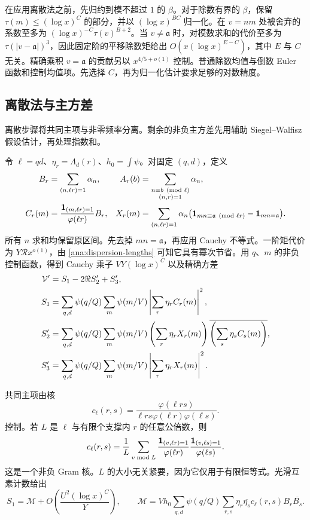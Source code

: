 在应用离散法之前，先归约到模不超过 $1$ 的 $\beta$。对于除数有界的 $\beta$，保留 $\tau(m)\le(\log x)^C$ 的部分，并以 $(\log x)^{BC}$ 归一化。在 $v=nm$ 处被舍弃的系数至多为 $(\log x)^{-C}\tau(v)^{B+2}$。当 $v\ne\mathfrak a$ 时，对模数求和的代价至多为 $\tau(|v-\mathfrak a|)^3$，因此固定阶的平移除数矩给出 $O(x(\log x)^{E-C})$，其中 $E$ 与 $C$ 无关。精确乘积 $v=\mathfrak a$ 的贡献另以 $x^{4/5+o(1)}$ 控制。普通除数均值与倒数 Euler 函数和控制均值项。先选择 $C$，再为归一化估计要求足够的对数精度。

\subsection{离散法与主方差}

离散步骤将共同主项与非零频率分离。剩余的非负主方差先用辅助 Siegel--Walfisz 假设估计，再处理指数和。

令 $\ell=qd$、$\eta_r=\Lambda_d(r)$、$h_0=\int\psi$。对固定 $(q,d)$，定义
\begin{align*}
 B_r&=\sum_{(n,\ell r)=1}\alpha_n,
 &A_r(b)&=\sum_{\substack{n\equiv b\pmod\ell\\(n,r)=1}}\alpha_n,\\
 C_r(m)&=\frac{\mathbf 1_{(m,\ell r)=1}}{\varphi(\ell r)}B_r,
 &X_r(m)&=\sum_{(n,\ell r)=1}\alpha_n
       \bigl(\mathbf 1_{mn\equiv \mathfrak{a}\pmod{\ell r}}-\mathbf 1_{mn=\mathfrak{a}}\bigr).
\end{align*}
所有 $n$ 求和均保留原区间。先去掉 $mn=\mathfrak{a}$，再应用 Cauchy 不等式。一阶矩代价为 $Y\mathcal R x^{o(1)}$，由 \eqref{ana:dispersion-lengths} 可知它具有幂次节省。用 $q$、$m$ 的非负控制函数，得到 Cauchy 乘子 $VY(\log x)^C$ 以及精确方差
\begin{align}
 \mathcal V'&=S_1-2\Re S_2'+S_3',\notag\\
 S_1&=\sum_{q,d}\psi(q/Q)\sum_m\psi(m/V)
                 \left|\sum_r\eta_rC_r(m)\right|^2,\notag\\
 S_2'&=\sum_{q,d}\psi(q/Q)\sum_m\psi(m/V)
       \left(\sum_r\eta_rX_r(m)\right)
       \overline{\left(\sum_s\eta_sC_s(m)\right)},\notag\\
 S_3'&=\sum_{q,d}\psi(q/Q)\sum_m\psi(m/V)
                 \left|\sum_r\eta_rX_r(m)\right|^2.
 \label{ana:variance}
\end{align}

共同主项由核
\[
 c_\ell(r,s)=\frac{\varphi(\ell rs)}{
       \ell rs\varphi(\ell r)\varphi(\ell s)}.
\]
控制。若 $L$ 是 $\ell$ 与有限个支撑内 $r$ 的任意公倍数，则
\begin{equation}
 c_\ell(r,s)=\frac1L\sum_{v\bmod L}
 \frac{\mathbf 1_{(v,\ell r)=1}}{\varphi(\ell r)}
 \frac{\mathbf 1_{(v,\ell s)=1}}{\varphi(\ell s)}.
 \label{ana:gram}
\end{equation}
这是一个非负 Gram 核。$L$ 的大小无关紧要，因为它仅用于有限恒等式。光滑互素计数给出
\begin{equation}
 S_1=\mathcal M+O\left(\frac{U^2(\log x)^C}{Y}\right),\qquad
 \mathcal M=Vh_0\sum_{q,d}\psi(q/Q)
        \sum_{r,s}\eta_r\overline{\eta_s}
               c_\ell(r,s)B_r\overline{B_s}.
 \label{ana:mean}
\end{equation}

